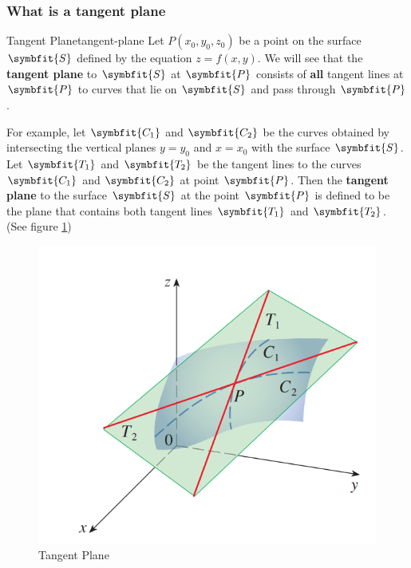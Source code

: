 \documentclass[math,code]{amznotes}
\theoremstyle{remark}
\begin{document}
\subsubsection{What is a tangent plane}
\begin{dfnbox}{Tangent Plane}{tangent-plane}
    Let $P(x_0,y_0,z_0)$ be a point on the surface $\symbfit{S}$ defined by the equation $z=f(x,y)$. We will see that the {\color{red} \textbf{tangent plane}} to $\symbfit{S}$ at $\symbfit{P}$ consists of {\color{red} \textbf{all}} tangent lines at $\symbfit{P}$ to curves that lie on $\symbfit{S}$ and pass through $\symbfit{P}$.
\end{dfnbox}
For example, let $\symbfit{C_1}$ and $\symbfit{C_2}$ be the curves obtained by intersecting the vertical planes $y=y_0$ and $x=x_0$ with the surface $\symbfit{S}$. Let $\symbfit{T_1}$ and $\symbfit{T_2}$ be the tangent lines to the curves $\symbfit{C_1}$ and $\symbfit{C_2}$ at point $\symbfit{P}$. Then the {\color{red} \textbf{tangent plane}} to the surface $\symbfit{S}$ at the point $\symbfit{P}$ is defined to be the plane that contains both tangent lines $\symbfit{T_1}$ and $\symbfit{T_2}$. (See figure \ref{fig:tangent-plane})
\begin{figure}[H]
    \centering
    \includegraphics[width=0.3\linewidth]{images/tangent-plane.png}
    \caption{Tangent Plane}
    \label{fig:tangent-plane}
\end{figure}
\end{document}
